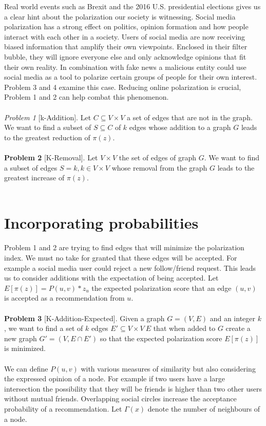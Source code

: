 Real world events such as Brexit and the 2016 U.S. presidential elections gives us a clear hint about the polarization our society is witnessing. Social media polarization has a strong effect on politics, opinion formation and how people interact with each other in a society. Users of social media are now receiving biased information that amplify their own viewpoints. Enclosed in their filter bubble, they will ignore everyone else and only acknowledge opinions that fit their own reality. In combination with fake news a malicious entity could use social media as a tool to polarize certain groups of people for their own interest. Problem 3 and 4 examine this case. Reducing online polarization is crucial, Problem 1 and 2 can help combat this phenomenon.
\\
\\
\textit{Problem 1} [k-Addition]. Let $C \subseteq	V \times V$ a set of edges that are not in the graph. We want to find a subset of $S \subseteq C$ of $k$ edges whose addition to a graph $G$ leads to the greatest reduction of $\pi(z)$.
\\
\\
\textbf{Problem 2} [K-Removal]. Let $V \times V$ the set of edges of graph $G$. We want to find a subset of edges $S = k, k \in V \times V$   whose removal from the graph $G$ leads to the greatest increase of $\pi(z)$.
\\
\\

\section{Incorporating probabilities}
\label{sec:probs}

Problem 1 and 2 are trying to find edges that will minimize the polarization index. We must no take for granted that these edges will be accepted. For example a social media user could reject a new follow/friend request. This leads us to consider additions with the expectation of being accepted. Let $E[\pi(z)] = P(u, v) * z_u$ the expected polarization score that an edge $(u, v)$ is accepted as a recommendation from $u$.
\\
\\
\textbf{Problem 3} [K-Addition-Expected]. Given a graph $G=(V,E)$ and an integer $k$, we want to find a set of $k$ edges $E′ \subseteq V×V \ E$ that when added to $G$ create a new graph $G' = (V,E \cap E')$ so that the expected polarization score $E[\pi(z)]$ is minimized.
\\
\\
We can define $P(u, v)$ with various measures of similarity but also considering the expressed opinion of a node. For example if two users have a large intersection the possibility that they will be friends is higher than two other users without mutual friends. Overlapping social circles increase the acceptance probability of a recommendation. Let $\Gamma(x)$ denote the number of neighbours of a node.
\\

